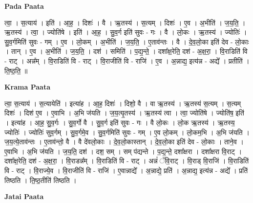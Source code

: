 \documentclass[17pt]{extarticle}
\begin{document}
\textbf{Pada Paata} \newline

त्वा॒ । स॒त्याय॑ । इति॑ । आ॒ह॒ । दिशः॑ । वै । ऋ॒तस्य॑ । स॒त्यम् । दिशः॑ । ए॒व । अ॒भीति॑ । ज॒य॒ति॒ । ऋ॒तस्य॑ । त्वा॒ । ज्योति॑षे । इति॑ । आ॒ह॒ । सु॒व॒र्ग इति॑ सुवः - गः । वै । लो॒कः । ऋ॒तस्य॑ । ज्योतिः॑ । सु॒व॒र्गमिति॑ सुवः - गम् । ए॒व । लो॒कम् । अ॒भीति॑ । ज॒य॒ति॒ । ए॒ताव॑न्तः । वै । दे॒व॒लो॒का इति॑ देव - लो॒काः । तान् । ए॒व । अ॒भीति॑ । ज॒य॒ति॒ । दश॑ । समिति॑ । प॒द्य॒न्ते॒ । दशा᳚क्ष॒रेति॒ दश॑ - अ॒क्ष॒रा॒ । वि॒राडिति॑ वि - राट् । अन्न᳚म् । वि॒राडिति॑ वि - राट् । वि॒राजीति॑ वि - राजि॑ । ए॒व । अ॒न्नाद्य॒ इत्य॑न्न - अद्ये᳚ । प्रतीति॑ । ति॒ष्ठ॒ति॒ ॥  \newline


\textbf{Krama Paata} \newline

त्वा॒ स॒त्याय॑ । स॒त्यायेति॑ । इत्या॑ह । आ॒ह॒ दिशः॑ । दिशो॒ वै । वा ऋ॒तस्य॑ । ऋ॒तस्य॑ स॒त्यम् । स॒त्यम् दिशः॑ । दिश॑ ए॒व । ए॒वाभि । अ॒भि ज॑यति । ज॒य॒त्यृ॒तस्य॑ । ऋ॒तस्य॑ त्वा । त्वा॒ ज्योति॑षे । ज्योति॑ष॒ इति॑ । इत्या॑ह । आ॒ह॒ सु॒व॒र्गः । सु॒व॒र्गो वै । सु॒व॒र्ग इति॑ सुवः - गः । वै लो॒कः । लो॒क ऋ॒तस्य॑ । ऋ॒तस्य॒ ज्योतिः॑ । ज्योतिः॑ सुव॒र्गम् । सु॒व॒र्गमे॒व । सु॒व॒र्गमिति॑ सुवः - गम् । ए॒व लो॒कम् । लो॒कम॒भि । अ॒भि ज॑यति । ज॒य॒त्ये॒ताव॑न्तः । ए॒ताव॑न्तो॒ वै । वै दे॑वलो॒काः । दे॒व॒लो॒कास्तान् । दे॒व॒लो॒का इति॑ देव - लो॒काः । ताने॒व । ए॒वाभि । अ॒भि ज॑यति । ज॒य॒ति॒ दश॑ । दश॒ सम् । सम् प॑द्यन्ते । प॒द्य॒न्ते॒ दशा᳚क्षरा । दशा᳚क्षरा वि॒राट् । दशा᳚क्ष॒रेति॒ दश॑ - अ॒क्ष॒रा॒ । वि॒राडन्न᳚म् । वि॒राडिति॑ वि - राट् । अन्नं॑ ॅवि॒राट् । वि॒राड् वि॒राजि॑ । वि॒राडिति॑ वि - राट् । वि॒राज्ये॒व । वि॒राजीति॑ वि - राजि॑ । ए॒वान्नाद्ये᳚ । अ॒न्नाद्ये॒ प्रति॑ । अ॒न्नाद्य॒ इत्य॑न्न - अद्ये᳚ । प्रति॑ तिष्ठति । ति॒ष्ठ॒तीति॑ तिष्ठति । \newline

\textbf{Jatai Paata} \newline
\end{document}
